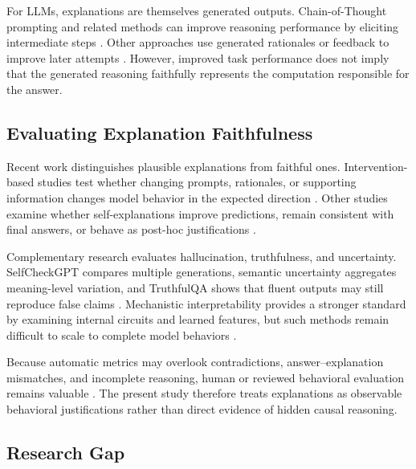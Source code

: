 \documentclass{article}
\begin{document}
For LLMs, explanations are themselves generated outputs. Chain-of-Thought
prompting and related methods can improve reasoning performance by
eliciting intermediate steps
\cite{wei2022chain,wang2023selfconsistency,zhou2023least,
yao2023tree,chen2023program}. Other approaches use generated rationales
or feedback to improve later attempts
\cite{zelikman2022star,shinn2023reflexion,madaan2023selfrefine}.
However, improved task performance does not imply that the generated
reasoning faithfully represents the computation responsible for the
answer.

\subsection{Evaluating Explanation Faithfulness}

Recent work distinguishes plausible explanations from faithful ones.
Intervention-based studies test whether changing prompts, rationales, or
supporting information changes model behavior in the expected direction
\cite{turpin2023language,lanham2023measuring,zaman2025causal}.
Other studies examine whether self-explanations improve predictions,
remain consistent with final answers, or behave as post-hoc
justifications
\cite{madsen2024selfexplanations,paul2024making,
matton2025walk,parcalabescu2024measuring}.

Complementary research evaluates hallucination, truthfulness, and
uncertainty. SelfCheckGPT compares multiple generations, semantic
uncertainty aggregates meaning-level variation, and TruthfulQA shows
that fluent outputs may still reproduce false claims
\cite{manakul2023selfcheckgpt,farquhar2024semantic,
lin2022truthfulqa}. Mechanistic interpretability provides a stronger
standard by examining internal circuits and learned features, but such
methods remain difficult to scale to complete model behaviors
\cite{elhage2021framework,bricken2023monosemanticity,
cunningham2024sparse,rai2024practical}.

Because automatic metrics may overlook contradictions,
answer--explanation mismatches, and incomplete reasoning, human or
reviewed behavioral evaluation remains valuable
\cite{celikyilmaz2020evaluation,ma2024openhexai,
mills2025almanacs}. The present study therefore treats explanations as
observable behavioral justifications rather than direct evidence of
hidden causal reasoning.

\subsection{Research Gap}
\end{document}

